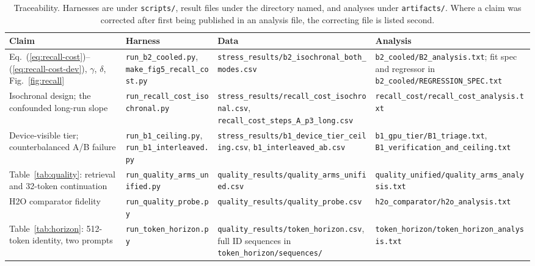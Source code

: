 \documentclass[manuscript,anonymous,review]{acmart}
\begin{document}
\begin{table}[t]
  \centering
  \caption{Traceability. Harnesses are under \texttt{scripts/}, result
  files under the directory named, and analyses under
  \texttt{artifacts/}. Where a claim was corrected after first being
  published in an analysis file, the correcting file is listed second.}
  \label{tab:trace}
  \renewcommand{\arraystretch}{1.2}
  \footnotesize
  \begin{tabular}{@{}p{}p{}p{}p{}@{}}
    \toprule
    \textbf{Claim} & \textbf{Harness} & \textbf{Data} & \textbf{Analysis} \\
    \midrule
    Eq.~(\ref{eq:recall-cost})--(\ref{eq:recall-cost-dev}), $\gamma$,
      $\delta$, Fig.~\ref{fig:recall}
      & \texttt{run\_b2\_cooled.py}, \texttt{make\_fig5\_recall\_cost.py}
      & \texttt{stress\_results/b2\_isochronal\_both\_modes.csv}
      & \texttt{b2\_cooled/B2\_analysis.txt}; fit spec and regressor in
        \texttt{b2\_cooled/REGRESSION\_SPEC.txt} \\
    Isochronal design; the confounded long-run slope
      & \texttt{run\_recall\_cost\_isochronal.py}
      & \texttt{stress\_results/recall\_cost\_isochronal.csv},
        \texttt{recall\_cost\_steps\_A\_p3\_long.csv}
      & \texttt{recall\_cost/recall\_cost\_analysis.txt} \\
    Device-visible tier; counterbalanced A/B failure
      & \texttt{run\_b1\_ceiling.py}, \texttt{run\_b1\_interleaved.py}
      & \texttt{stress\_results/b1\_device\_tier\_ceiling.csv},
        \texttt{b1\_interleaved\_ab.csv}
      & \texttt{b1\_gpu\_tier/B1\_triage.txt},
        \texttt{B1\_verification\_and\_ceiling.txt} \\
    \midrule
    Table~\ref{tab:quality}: retrieval and 32-token continuation
      & \texttt{run\_quality\_arms\_unified.py}
      & \texttt{quality\_results/quality\_arms\_unified.csv}
      & \texttt{quality\_unified/quality\_arms\_analysis.txt} \\
    H2O comparator fidelity
      & \texttt{run\_quality\_probe.py}
      & \texttt{quality\_results/quality\_probe.csv}
      & \texttt{h2o\_comparator/h2o\_analysis.txt} \\
    Table~\ref{tab:horizon}: 512-token identity, two prompts
      & \texttt{run\_token\_horizon.py}
      & \texttt{quality\_results/token\_horizon.csv}, full ID sequences
        in \texttt{token\_horizon/sequences/}
      & \texttt{token\_horizon/token\_horizon\_analysis.txt} \\

\end{tabular}
\end{table}
\end{document}
